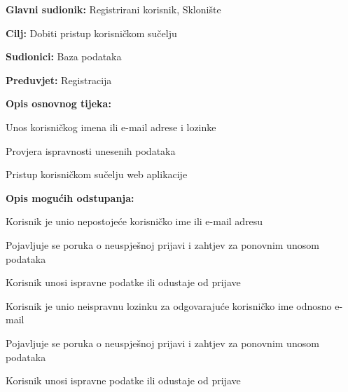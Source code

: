 					\noindent {}
					\begin{packed_item}
						
						\item \textbf{Glavni sudionik: }Registrirani korisnik, Sklonište
						\item  \textbf{Cilj:} Dobiti pristup korisničkom sučelju
						\item  \textbf{Sudionici:} Baza podataka
						\item  \textbf{Preduvjet:} Registracija
						\item  \textbf{Opis osnovnog tijeka:}
						
						\item[] \begin{packed_enum}
							
							\item Unos korisničkog imena ili e-mail adrese i lozinke
							\item Provjera ispravnosti unesenih podataka
							\item Pristup korisničkom sučelju web aplikacije
						\end{packed_enum}
						
						\item  \textbf{Opis mogućih odstupanja:}
						
						\item[] \begin{packed_item}
							
							\item[2.a] Korisnik je unio nepostojeće korisničko ime ili e-mail adresu
							\item[] \begin{packed_enum}
								
								\item Pojavljuje se poruka o neuspješnoj prijavi i zahtjev za ponovnim unosom podataka
								\item Korisnik unosi ispravne podatke ili odustaje od prijave
								
							\end{packed_enum}
							\item[2.b] Korisnik je unio neispravnu lozinku za odgovarajuće korisničko ime odnosno e-mail
							\item[] \begin{packed_enum}
								
								\item Pojavljuje se poruka o neuspješnoj prijavi i zahtjev za ponovnim unosom podataka
								\item Korisnik unosi ispravne podatke ili odustaje od prijave
								
							\end{packed_enum}
							
						\end{packed_item}
					\end{packed_item}
